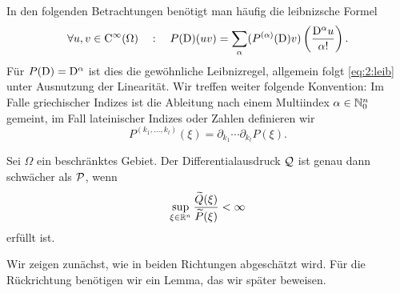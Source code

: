 In den folgenden Betrachtungen benötigt man häufig die leibnizsche Formel
\begin{equation}\label{eq:2:leib}
\forall u,v\in \mathrm C^\infty(\Omega) \quad:\quad P(\mathrm D)(uv)=\sum_{\alpha}(P^{(\alpha)}(\mathrm D)v)\left(\frac{\mathrm D^\alpha u}{\alpha!}\right).
\end{equation} 
Für $P(\mathrm D)=\mathrm D^\alpha$ ist dies die gewöhnliche Leibnizregel, allgemein folgt \eqref{eq:2:leib} unter Ausnutzung der Linearität. Wir treffen weiter folgende Konvention:
Im Falle griechischer Indizes
ist die Ableitung nach einem Multiindex $\alpha\in\mathbb N^n_0$ gemeint,
im Fall lateinischer Indizes oder Zahlen definieren wir
\begin{equation}
P^{(k_1,\dots,k_l)}(\xi)=\partial_{k_1}\cdots\partial_{k_l}P(\xi).
\end{equation}

\begin{thm}\label{thm:2:2.1}
Sei $\Omega$ ein beschränktes Gebiet.
Der Differentialausdruck $\mathcal Q$ ist genau dann schwächer als $\mathcal P$,
wenn
\begin{equation}\label{eq:thm:2:2.1}
\sup_{\xi\in\mathbb R^n}\frac{\widetilde{Q}(\xi)}{\widetilde{P}(\xi)}<\infty
\end{equation}
erfüllt ist.
\end{thm}

Wir zeigen zunächst, wie in beiden Richtungen abgeschätzt wird.
Für die Rückrichtung benötigen wir ein Lemma,
das wir später beweisen.

